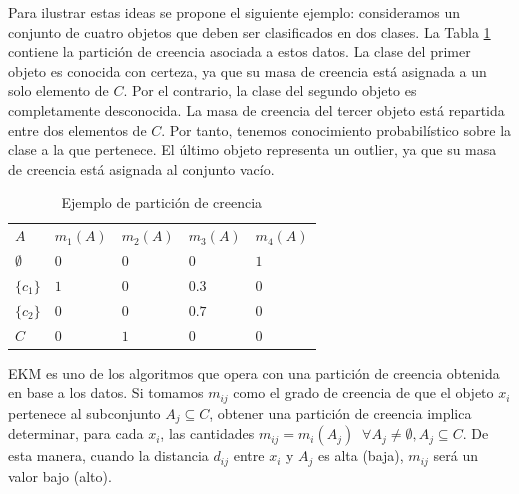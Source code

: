 Para ilustrar estas ideas se propone el siguiente ejemplo: consideramos un conjunto de cuatro objetos que deben ser clasificados en dos clases. La Tabla \ref{tab:tabla2} contiene la partición de creencia asociada a estos datos. La clase del primer objeto es conocida con certeza, ya que su masa de creencia está asignada a un solo elemento de $C$. Por el contrario, la clase del segundo objeto es completamente desconocida. La masa de creencia del tercer objeto está repartida entre dos elementos de $C$. Por tanto, tenemos conocimiento probabilístico sobre la clase a la que pertenece. El último objeto representa un outlier, ya que su masa de creencia está asignada al conjunto vacío.

\begin{table}[h]
	\centering
	\setlength{\arrayrulewidth}{1mm}
	\setlength{\tabcolsep}{10pt}
	\renewcommand{\arraystretch}{1}
	
	\begin{tabular}{ >{\centering\arraybackslash}m{1cm}  >{\centering\arraybackslash}m{1cm}>{\centering\arraybackslash}m{1cm}>{\centering\arraybackslash}m{1cm}>{\centering\arraybackslash}m{1cm}}
		\hline
		\rowcolor{black}
		\multicolumn{5}{c}{\bf \color{white}{Ejemplo de partición de creencia}}\\
		\hline
		\rowcolor{gray!50}
		\textbf{$A$} & \textbf{$m_1(A)$} & \textbf{$m_2(A)$} & \textbf{$m_3(A)$} & \textbf{$m_4(A)$} \\
		$\emptyset$ & $0$ & $0$ & $0$ & $1$ \\
		$\{c_1\}$ & $1$ & $0$ & $0.3$ & $0$ \\
		$\{c_2\}$ & $0$ & $0$ & $0.7$ & $0$ \\
		$C$ & $0$ & $1$ & $0$ & $0$ \\
		\hline
		
	\end{tabular}
	\caption[Ejemplo de partición de creencia]{Ejemplo de partición de creencia \cite{CECM:2012}}
	\label{tab:tabla2}
\end{table}

\acf{EKM} es uno de los algoritmos que opera con una partición de creencia obtenida en base a los datos. Si tomamos $m_{ij}$ como el grado de creencia de que el objeto $x_i$ pertenece al subconjunto $A_j \subseteq C$, obtener una partición de creencia implica determinar, para cada $x_i$, las cantidades $m_{ij} = m_i(A_j)\;\; \forall A_j \neq \emptyset, A_j \subseteq C$. De esta manera, cuando la distancia $d_{ij}$ entre $x_i$ y $A_j$ es alta (baja), $m_{ij}$ será un valor bajo (alto).

